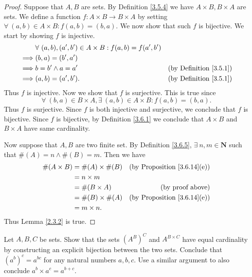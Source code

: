 \begin{proof}
    Suppose that \(A, B\) are sets.
    By Definition \ref{3.5.4} we have \(A \times B, B \times A\) are sets.
    We define a function \(f : A \times B \to B \times A\) by setting \(\forall\ (a, b) \in A \times B : f(a, b) = (b, a)\).
    We now show that such \(f\) is bijective.
    We start by showing \(f\) is injective.
    \begin{align*}
                 & \forall\ (a, b), (a', b') \in A \times B : f(a, b) = f(a', b')                                      \\
        \implies & (b, a) = (b', a')                                                                                   \\
        \implies & b = b' \land a = a'                                            & \text{(by Definition \ref{3.5.1})} \\
        \implies & (a, b) = (a', b').                                             & \text{(by Definition \ref{3.5.1})}
    \end{align*}
    Thus \(f\) is injective.
    Now we show that \(f\) is surjective.
    This is true since
    \[
        \forall\ (b, a) \in B \times A, \exists\ (a, b) \in A \times B : f(a, b) = (b, a).
    \]
    Thus \(f\) is surjective.
    Since \(f\) is both injective and surjective, we conclude that \(f\) is bijective.
    Since \(f\) is bijective, by Definition \ref{3.6.1} we conclude that \(A \times B\) and \(B \times A\) have same cardinality.

    Now suppose that \(A, B\) are two finite set.
    By Definition \ref{3.6.5}, \(\exists\ n, m \in \mathbf{N}\) such that \(\#(A) = n \land \#(B) = m\).
    Then we have
    \begin{align*}
        \#(A \times B) & = \#(A) \times \#(B) & \text{(by Proposition \ref{3.6.14}(e))} \\
                       & = n \times m                                                   \\
                       & = \#(B \times A)     & \text{(by proof above)}                 \\
                       & = \#(B) \times \#(A) & \text{(by Proposition \ref{3.6.14}(e))} \\
                       & = m \times n.
    \end{align*}
    Thus Lemma \ref{2.3.2} is true.
\end{proof}

\begin{exercise}\label{ex 3.6.6}
    Let \(A, B, C\) be sets.
    Show that the sets \((A^B)^C\) and \(A^{B \times C}\) have equal cardinality by constructing an explicit bijection between the two sets.
    Conclude that \((a^b)^c = a^{bc}\) for any natural numbers \(a, b, c\).
    Use a similar argument to also conclude \(a^b \times a^c = a^{b+c}\).
\end{exercise}

